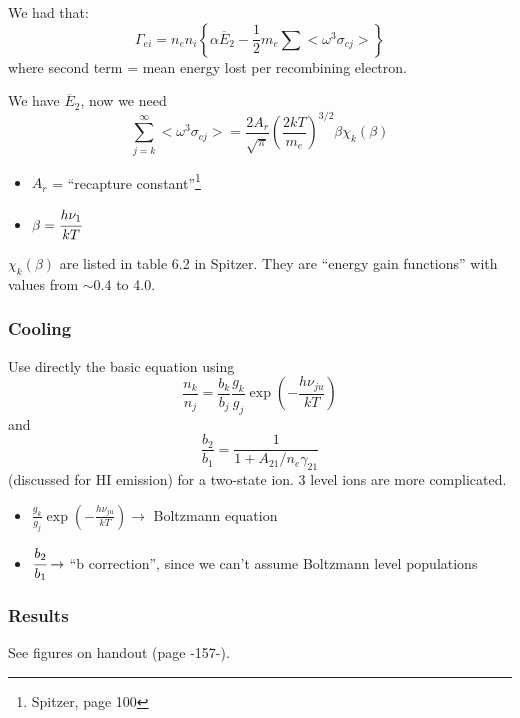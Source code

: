 \documentclass[12pt]{article}
\newcommand{\mar}[1]{\hspace{0pt}\marginpar{-\textcolor{black}{#1}-}}
\begin{document}
We had that:
\[
    \Gamma_{ei} = n_{e}n_{i}\left\{\alpha\overline{E}_{2}
    - \frac{1}{2}m_{e}\sum{<\omega^{3}\sigma_{cj}>}\right\}
    \]
where second term = mean energy lost per recombining electron.

We have $\overline{E}_{2}$, now we need
\[
    \sum_{j=k}^{\infty}{<\omega^{3}\sigma_{cj}>}
    = \frac{2A_{r}}{\sqrt{\pi}} \left(\frac{2kT}{m_{e}}\right)^{3/2}
    \beta\chi_{k}(\beta)
    \]
\begin{itemize}[label={}]
    \item $A_{r}$ = ``recapture constant''\footnote{Spitzer, page 100}
    \item $\beta = \cfrac{h\nu_{1}}{kT}$
\end{itemize}
$\chi_{k}(\beta)$ are listed in table 6.2 in Spitzer.
They are ``energy gain functions'' with values from $\sim$0.4 to 4.0.

\subsubsection{Cooling}

Use directly the basic equation using
\[
    \frac{n_{k}}{n_{j}} = \frac{b_{k}}{b_{j}}
    \frac{g_{k}}{g_{j}}\exp\left(-\frac{h\nu_{ju}}{kT}\right)
    \]
and
\[
    \frac{b_{2}}{b_{1}} = \frac{1}{1 + A_{21}/n_{e}\gamma_{21}}
    \]
(discussed for HI emission) for a two-state ion.
3 level ions are more complicated.
\begin{itemize}
    \item $\frac{g_{k}}{g_{j}}\exp\left(-\frac{h\nu_{ju}}{kT}\right)
        \rightarrow$ Boltzmann equation
    \item $\cfrac{b_{2}}{b_{1}} \rightarrow$ ``b correction'', since we
        can't assume Boltzmann level populations
\end{itemize}

\subsubsection{Results}\mar{156}
See figures on handout (page -157-).
\end{document}
